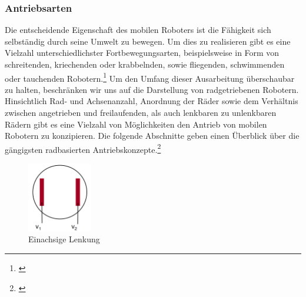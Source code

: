 \subsubsection{Antriebsarten}
\color{process}
Die entscheidende Eigenschaft des mobilen Roboters ist die Fähigkeit sich selbständig durch seine Umwelt zu bewegen. Um dies zu realisieren gibt es eine Vielzahl unterschiedlichster Fortbewegungsarten, beispielsweise in Form von schreitenden, kriechenden oder krabbelnden, sowie fliegenden, schwimmenden oder tauchenden Robotern.\footnote{\citep[vgl.][Mobile Roboter, Seite 103]{Hertzberg.MobileRoboter}\label{note20}}
\newline
Um den Umfang dieser Ausarbeitung überschaubar zu halten, beschränken wir uns auf die Darstellung von radgetriebenen Robotern.
\medskip
\newline
Hinsichtlich Rad- und Achsenanzahl, Anordnung der Räder sowie dem Verhältnis zwischen angetrieben und freilaufenden, als auch lenkbaren zu unlenkbaren Rädern gibt es eine Vielzahl von Möglichkeiten den Antrieb von mobilen Robotern zu konzipieren. Die folgende Abschnitte geben einen Überblick über die gängigsten radbasierten Antriebskonzepte.\footnote{\citep[vgl.][Mobile Roboter, Seite 107 f.]{Hertzberg.MobileRoboter}\label{note21}}
\begin{figure}
	\vspace{+0.5cm}
	\begin{center}
		\includegraphics[width=0.25\textwidth]{images/technische_grundlagen/Differentialantrieb.png}
	\end{center}
	\caption{Einachsige Lenkung}
	\label{fig:einachsenlenkung}
\end{figure}
